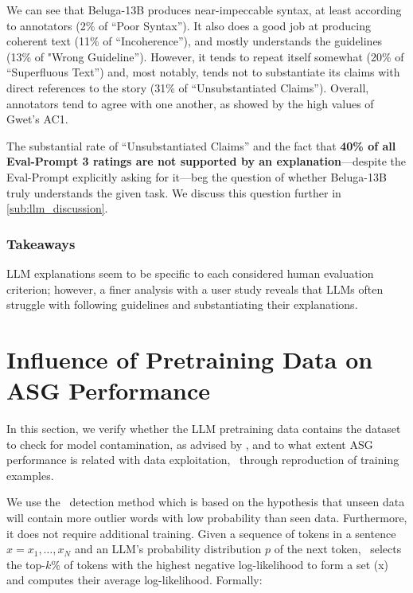 We can see that Beluga-13B produces near-impeccable syntax, at least according to annotators (2\% of ``Poor Syntax''). It also does a good job at producing coherent text (11\% of ``Incoherence''), and mostly understands the guidelines (13\% of "Wrong Guideline''). However, it tends to repeat itself somewhat (20\% of ``Superfluous Text'') and, most notably, tends not to substantiate its claims with direct references to the story (31\% of ``Unsubstantiated Claims''). Overall, annotators tend to agree with one another, as showed by the high values of Gwet's AC1.

The substantial rate of ``Unsubstantiated Claims'' and the fact that \textbf{40\% of all Eval-Prompt 3 ratings are not supported by an explanation}---despite the Eval-Prompt explicitly asking for it---beg the question of whether Beluga-13B truly understands the given task. We discuss this question further in \autoref{sub:llm_discussion}.

\subsubsection{Takeaways}

LLM explanations seem to be specific to each considered human evaluation criterion; however, a finer analysis with a user study reveals that LLMs often struggle with following guidelines and substantiating their explanations.

\section{Influence of Pretraining Data on ASG Performance}
\label{sec:asg2_analysis}

In this section, we verify whether the LLM pretraining data contains the {\wpfan} dataset to check for model contamination, as advised by \citet{magar-schwartz-2022-data}, and to what extent ASG performance is related with data exploitation, \eg\ through reproduction of training examples.

We use the \minkprob\ detection method \citep{shi2023detecting} which is based on the hypothesis that unseen data will contain more outlier words with low probability than seen data. Furthermore, it does not require additional training. Given a sequence of tokens in a sentence $x = x_1, \dots, x_N$ and an LLM's probability distribution $p$ of the next token, \minkprob\ selects the top-$k$\% of tokens with the highest negative log-likelihood to form a set \mink(x) and computes their average log-likelihood. Formally:

